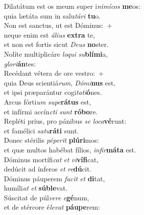 \evenverse Dilatátum est os meum super i\textit{ni}\textit{mí}\textit{cos} \textbf{me}os:~\*\\
\evenverse quia lætáta sum in salu\textit{tá}\textit{ri} \textbf{tu}o.\\
\oddverse Non est sanctus, ut est Dóminus:~+\\
\oddverse  neque enim est \textit{á}\textit{li}\textit{us} \textbf{ex}\textbf{tra} te,~\*\\
\oddverse et non est fortis sicut \textit{De}\textit{us} \textbf{no}ster.\\
\evenverse Nolíte multiplicáre \textit{lo}\textit{qui} \textit{su}\textbf{blí}\textbf{mi}a,~\*\\
\evenverse \textit{glo}\textit{ri}\textbf{án}tes:\\
\oddverse Recédant vétera de ore vestro:~+\\
\oddverse  quia Deus scientiá\textit{rum}, \textit{Dó}\textit{mi}\textbf{nus} est,~\*\\
\oddverse et ipsi præparántur cogi\textit{ta}\textit{ti}\textbf{ó}nes.\\
\evenverse Arcus fórti\textit{um} \textit{su}\textit{pe}\textbf{rá}\textbf{tus} est,~\*\\
\evenverse et infírmi accín\textit{cti} \textit{sunt} \textbf{ró}\textbf{bo}re.\\
\oddverse Repléti prius, pro pánibus \textit{se} \textit{lo}\textit{ca}\textbf{vé}runt:~\*\\
\oddverse et famélici \textit{sa}\textit{tu}\textbf{rá}\textbf{ti} sunt.\\
\evenverse Donec stérilis \textit{pé}\textit{pe}\textit{rit} \textbf{plú}\textbf{ri}mos:~\*\\
\evenverse et quæ multos habébat fílios, \textit{in}\textit{fir}\textbf{má}\textbf{ta} est.\\
\oddverse Dóminus mortífi\textit{cat} \textit{et} \textit{vi}\textbf{ví}\textbf{fi}cat,~\*\\
\oddverse dedúcit ad ínferos \textit{et} \textit{re}\textbf{dú}cit.\\
\evenverse Dóminus páuperem \textit{fa}\textit{cit} \textit{et} \textbf{di}tat,~\*\\
\evenverse humíli\textit{at} \textit{et} \textbf{sú}\textbf{ble}vat.\\
\oddverse Súscitat de púl\textit{ve}\textit{re} \textit{e}\textbf{gé}num,~\*\\
\oddverse et de stércore é\textit{le}\textit{vat} \textbf{páu}\textbf{pe}rem:\\
